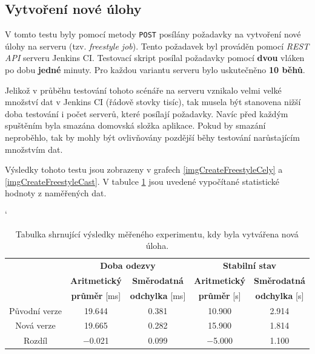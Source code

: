         \subsection{Vytvoření nové úlohy}
            V tomto testu byly pomocí metody \texttt{POST} posílány požadavky na vytvoření
            nové úlohy na serveru (tzv. \emph{freestyle job}). Tento požadavek
            byl prováděn pomocí \emph{REST API} serveru Jenkins CI.
            Testovací skript posílal požadavky pomocí \textbf{dvou} vláken po dobu \textbf{jedné} minuty.
            Pro každou variantu serveru bylo uskutečněno \textbf{10 běhů}.

            Jelikož v průběhu testování tohoto scénáře na serveru vznikalo velmi velké množství dat v Jenkins CI (řádově stovky tisíc),
            tak musela být stanovena nižší doba testování i počet serverů, které posílají požadavky.
            Navíc před každým spuštěním byla smazána domovská složka aplikace. Pokud by smazání neproběhlo,
            tak by mohly být ovlivňovány pozdější běhy testování narůstajícím množstvím dat.

            Výsledky tohoto testu jsou zobrazeny v grafech \ref{imgCreateFreestyleCely} a \ref{imgCreateFreestyleCast}.
            V tabulce \ref{tabCreateFreestyleFinal} jsou uvedené vypočítané statistické hodnoty z
            naměřených dat.

            \begin{table}[ht]
             \catcode`
             \begin{adjustwidth}{-0.5cm}{}
             \begin{center}
              \begin{tabular}{| c || c | c || c | c |} \hline
                \multirow{3}{*}{}  &   \multicolumn{2}{c||}{\textbf{Doba odezvy}}  &  \multicolumn{2}{c|}{\textbf{Stabilní stav}}\\ \cline{2-5}
                 & \textbf{Aritmetický}  &  \textbf{Směrodatná}  &  \textbf{Aritmetický} &  \textbf{Směrodatná}\\ 
                 & \textbf{průměr} [ms]  &  \textbf{odchylka} [ms]  &  \textbf{průměr} [s]  &  \textbf{odchylka} [s]\\ \hline
                Původní verze & 19.644  &  0.381 &  10.900 & 2.914 \\\hline
                Nová verze &  19.665 &  0.282 &  15.900 & 1.814 \\\hline
                Rozdíl & $-$0.021  &  0.099 &  $-$5.000 & 1.100 \\\hline  
              \end{tabular}
              \caption{Tabulka shrnující výsledky měřeného experimentu, kdy byla vytvářena nová úloha.}
              \label{tabCreateFreestyleFinal}
             \end{center}
             \end{adjustwidth}
            \end{table}


